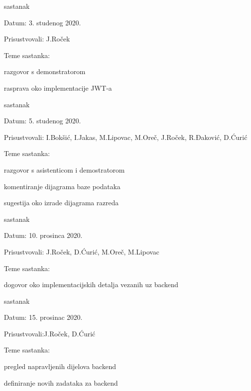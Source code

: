 \begin{packed_enum}
			\item  sastanak
		\item[] \begin{packed_item}
			\item Datum: 3. studenog 2020.
			\item Prisustvovali: J.Roček
			\item Teme sastanka:
			\begin{packed_item}
				\item razgovor s demonstratorom  
				\item rasprava oko implementacije JWT-a 
			\end{packed_item}
		\end{packed_item}
		
			\item  sastanak
		\item[] \begin{packed_item}
			\item Datum: 5. studenog 2020.
			\item Prisustvovali: I.Bokšić, I.Jakas, M.Lipovac, M.Oreč, J.Roček, R.Đaković, D.Ćurić
			\item Teme sastanka:
			\begin{packed_item}
				\item razgovor s asistenticom i demostratorom
				\item komentiranje dijagrama baze podataka
				\item sugestija oko izrade dijagrama razreda
			\end{packed_item}
		\end{packed_item}
		
		  \item  sastanak
		\item[] \begin{packed_item}
			\item Datum: 10. prosinca 2020.
			\item Prisustvovali: J.Roček, D.Ćurić, M.Oreč, M.Lipovac
			\item Teme sastanka:
			\begin{packed_item}
				\item dogovor oko implementacijskih detalja vezanih
				     uz backend
			\end{packed_item}
		\end{packed_item}
		
			\item  sastanak
		\item[] \begin{packed_item}
			\item Datum: 15. prosinac 2020.
			\item Prisustvovali:J.Roček, D.Ćurić 
			\item Teme sastanka:
			\begin{packed_item}
				\item pregled napravljenih dijelova backend
				\item definiranje novih zadataka za backend
				

\end{packed_item}
\end{packed_item}
\end{packed_enum}
